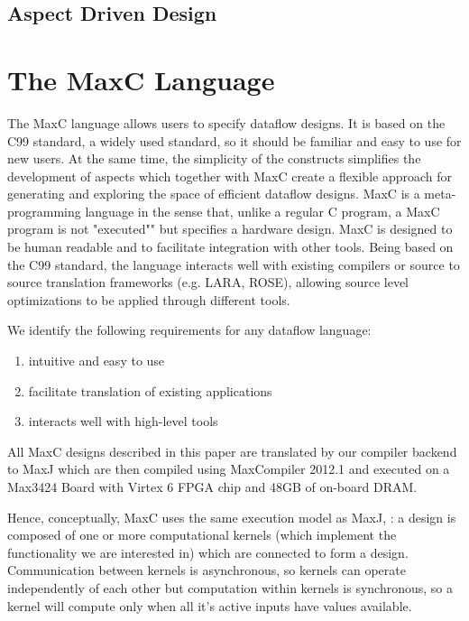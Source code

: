 
\subsection{Aspect Driven Design}








\section{The  MaxC Language}

The MaxC language allows users to specify dataflow designs. It is
based on the C99 standard, a widely used standard, so it should be
familiar and easy to use for new users. At the same time, the
simplicity of the constructs simplifies the development of aspects
which together with MaxC create a flexible approach for generating and
exploring the space of efficient dataflow designs.  MaxC is a
meta-programming language in the sense that, unlike a regular C
program, a MaxC program is not "executed"" but specifies a hardware
design. MaxC is designed to be human readable and to facilitate
integration with other tools. Being based on the C99 standard, the
language interacts well with existing compilers or source to source
translation frameworks (e.g. LARA, ROSE), allowing source level
optimizations to be applied through different tools.

We identify the following requirements for any dataflow language:
\begin{enumerate}
\item intuitive and easy to use
\item facilitate translation of existing applications
\item interacts well with high-level tools
\end{enumerate}

All MaxC designs described in this paper are translated by our
compiler backend to MaxJ which are then compiled using MaxCompiler
2012.1 and executed on a Max3424 Board with Virtex 6 FPGA chip and
48GB of on-board DRAM.


Hence, conceptually, MaxC uses the same execution model as MaxJ,
: a design is composed of one or more computational kernels
(which implement the functionality we are interested in) which are
connected to form a design. Communication between kernels is
asynchronous, so kernels can operate independently of each other but
computation within kernels is synchronous, so a kernel will compute
only when all it's active inputs have values available.

